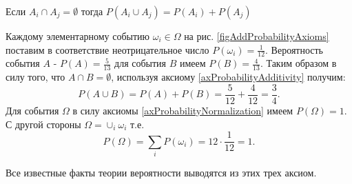 \begin{axiom}[Аддитивность]
\label{axProbabilityAdditivity}
Если $A_i \cap A_j = \emptyset$ тогда 
$P\left(A_i \cup A_j\right) = P\left(A_i\right) + P\left(A_j\right)$
\end{axiom}

\begin{example}

Каждому элементарному событию $\omega_i \in \Omega$
на рис. \ref{figAddProbabilityAxioms} поставим в соответствие
неотрицательное число 
$P\left(\omega_i\right) = \frac{1}{12}$. Вероятность события $A$ - 
$P\left(A\right) = \frac{5}{13}$ для события $B$ имеем
$P\left(B\right) = \frac{4}{13}$. Таким образом в силу того, что 
$A \cap B = \emptyset$, используя аксиому
\ref{axProbabilityAdditivity} получим:
\[
P\left(A\cup B\right) = 
P\left(A\right) + P\left(B\right) = 
\frac{5}{12} + \frac{4}{12} = \frac{3}{4}.
\]
Для события $\Omega$ в силу аксиомы \ref{axProbabilityNormalization}
имеем $P\left(\Omega\right) = 1$. С другой стороны 
$\Omega = \cup_i \omega_i$ т.е. 
\[
P\left(\Omega\right) = \sum_i P\left(\omega_i\right) =
12\cdot\frac{1}{12} = 1.
\]
\end{example}


Все известные факты теории вероятности выводятся из этих трех аксиом.  


